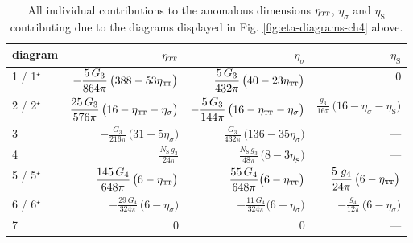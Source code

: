 \documentclass[11pt]{book} %
\newcommand\TTspace{ -1pt }
\newcommand\etaTT{ \eta_{\scriptscriptstyle{\mathrm{T\hspace{\TTspace}T}}} }
\newcommand\etaS{ \eta_{\scriptscriptstyle{\mathrm{S}}} }
\newcommand\NS{ N_{\scriptscriptstyle{\mathrm{S}}} }
\numberwithin{equation}{chapter}
\begin{document}
{
  \setlength{\extrarowheight}{10pt}
  \begin{table}[p]
    \begin{center}
      \begin{tabular}{ l@{\hskip 5mm} r@{\hskip 7mm} r@{\hskip 7mm} r }
        \toprule
        diagram        &  $\etaTT$ & $\eta_\sigma$ & $\etaS$ \\
        \midrule
        1 / 1$^\star$  &  $\displaystyle -\frac{5 \, G_3}{864 \pi} \, \big( 388-53\etaTT \big)$
                       &  $\displaystyle \frac{5 \,  G_3}{432\pi} \, \big(40-23\etaTT \big)$
                       &  $0$                                              \\
        2 / 2$^\star$  &  $\displaystyle \frac{25 \, G_3}{576 \pi} \, \big(16-\etaTT-\eta_{\sigma} \big)$
                       &  $\displaystyle - \frac{5 \,  G_3}{144\pi} \, \big(16-\etaTT- \eta_{\sigma} \big)$
                       &  $\displaystyle \frac{g_3}{16\pi} \, \big(16-\eta_{\sigma}-\etaS \big)$ \\
        3              &  $\displaystyle -\frac{G_3}{216 \pi} \, \big(31-5\eta_{\sigma} \big)$
                       &  $\displaystyle \frac{G_3}{432\pi} \, \big(136 - 35 \eta_{\sigma} \big)$
                       &  ---                                              \\
        4              &  $\displaystyle \frac{\NS \, g_3}{24 \pi}$
                       &  $\displaystyle \frac{\NS \, g_3}{48 \pi} \, \big(8-3\etaS \big)$
                       &  ---                                              \\
        5 / 5$^\star$  &  $\displaystyle \frac{145 \, G_4}{648 \pi} \, \big(6-\etaTT  \big)$
                       &  $\displaystyle \frac{55 \, G_4}{648 \pi}\big(6-\etaTT \big)$
                       &  $\displaystyle \frac{5 \ g_4}{24\pi} \, \big(6-\etaTT \big)$            \\
        6 / 6$^\star$  &  $\displaystyle -\frac{29 \, G_4}{324 \pi} \, \big(6-\eta_{\sigma} \big)$
                       &  $\displaystyle -\frac{11 \, G_4}{324 \pi} \big(6-\eta_{\sigma} \big)$
                       &  $\displaystyle -\frac{g_4}{12 \pi} \, \big(6-\eta_{\sigma} \big)$       \\
        7              &  $0$
                       &  $0$
                       &  ---                                              \\
        \bottomrule
      \end{tabular}
    \end{center}
    \caption[Coordinates and critical exponents of fixed points in perturbative approximation]
    {
      All individual contributions to the anomalous dimensions $\etaTT$, $\eta_\sigma$ and $\etaS$
      contributing due to the diagrams displayed in Fig. \ref{fig:eta-diagrams-ch4} above.
    }
    \label{tab:eta-results}
  \end{table}
}
\end{document}
